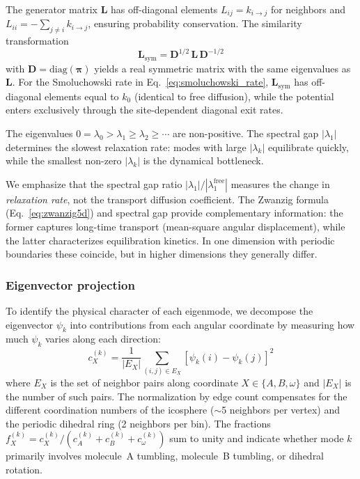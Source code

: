 \documentclass[aps,jcp,reprint,superscriptaddress]{revtex4-2}
\begin{document}
The generator matrix $\mathbf{L}$ has off-diagonal elements
$L_{ij} = k_{i \to j}$ for neighbors and
$L_{ii} = -\sum_{j \ne i} k_{i \to j}$, ensuring probability conservation.
The similarity transformation
\begin{equation}
  \mathbf{L}_\mathrm{sym} = \mathbf{D}^{1/2} \, \mathbf{L} \, \mathbf{D}^{-1/2}
  \label{eq:symmetrize}
\end{equation}
with $\mathbf{D} = \mathrm{diag}(\bm{\pi})$ yields a real symmetric matrix
with the same eigenvalues as $\mathbf{L}$.
For the Smoluchowski rate in Eq.~\eqref{eq:smoluchowski_rate},
$\mathbf{L}_\mathrm{sym}$ has off-diagonal elements equal to $k_0$
(identical to free diffusion), while the potential enters exclusively through
the site-dependent diagonal exit rates.

The eigenvalues $0 = \lambda_0 > \lambda_1 \ge \lambda_2 \ge \cdots$ are
non-positive.
The spectral gap $|\lambda_1|$ determines the slowest relaxation rate:
modes with large $|\lambda_k|$ equilibrate quickly, while the smallest
non-zero $|\lambda_k|$ is the dynamical bottleneck.

We emphasize that the spectral gap ratio $|\lambda_1|/|\lambda_1^\mathrm{free}|$
measures the change in \emph{relaxation rate}, not the transport diffusion
coefficient.
The Zwanzig formula (Eq.~\ref{eq:zwanzig5d}) and spectral gap provide
complementary information: the former captures long-time transport
(mean-square angular displacement), while the latter characterizes
equilibration kinetics.
In one dimension with periodic boundaries these coincide, but in higher
dimensions they generally differ.

\subsubsection{Eigenvector projection}

To identify the physical character of each eigenmode, we decompose the
eigenvector $\psi_k$ into contributions from each angular coordinate by
measuring how much $\psi_k$ varies along each direction:
\begin{equation}
  c_X^{(k)} = \frac{1}{|E_X|} \sum_{(i,j) \in E_X} [\psi_k(i) - \psi_k(j)]^2
  \label{eq:projection}
\end{equation}
where $E_X$ is the set of neighbor pairs along coordinate $X \in \{A, B, \omega\}$
and $|E_X|$ is the number of such pairs.
The normalization by edge count compensates for the different coordination
numbers of the icosphere ($\sim$5 neighbors per vertex) and the periodic
dihedral ring (2 neighbors per bin).
The fractions $f_X^{(k)} = c_X^{(k)} / (c_A^{(k)} + c_B^{(k)} + c_\omega^{(k)})$
sum to unity and indicate whether mode $k$ primarily involves molecule~A
tumbling, molecule~B tumbling, or dihedral rotation.
\end{document}
